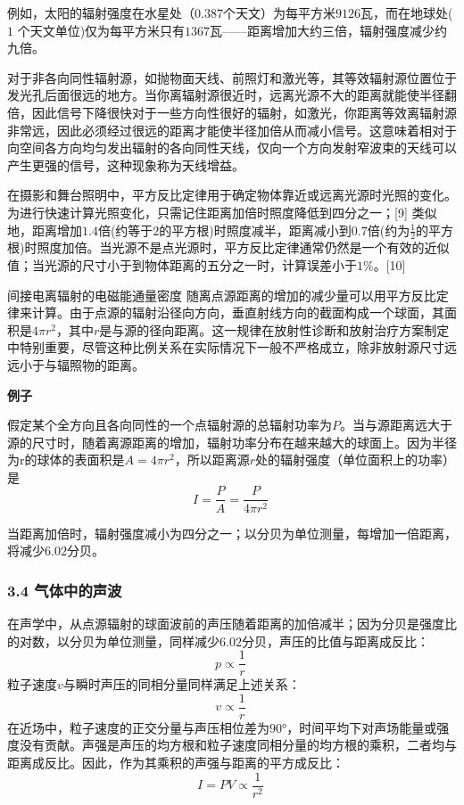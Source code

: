 例如，太阳的辐射强度在水星处（$0.387$个天文）为每平方米$9126$瓦，而在地球处($1$ 个天文单位)仅为每平方米只有$1367$瓦——距离增加大约三倍，辐射强度减少约九倍。

对于非各向同性辐射源，如抛物面天线、前照灯和激光等，其等效辐射源位置位于发光孔后面很远的地方。当你离辐射源很近时，远离光源不大的距离就能使半径翻倍，因此信号下降很快对于一些方向性很好的辐射，如激光，你距离等效离辐射源非常远，因此必须经过很远的距离才能使半径加倍从而减小信号。这意味着相对于向空间各方向均匀发出辐射的各向同性天线，仅向一个方向发射窄波束的天线可以产生更强的信号，这种现象称为天线增益。

在摄影和舞台照明中，平方反比定律用于确定物体靠近或远离光源时光照的变化。为进行快速计算光照变化，只需记住距离加倍时照度降低到四分之一；[9] 类似地，距离增加$1.4$倍(约等于$2$的平方根)时照度减半，距离减小到$0.7$倍(约为$\frac{1}{2}$的平方根)时照度加倍。当光源不是点光源时，平方反比定律通常仍然是一个有效的近似值；当光源的尺寸小于到物体距离的五分之一时，计算误差小于$1 \%$。[10]

间接电离辐射的电磁能通量密度 随离点源距离的增加的减少量可以用平方反比定律来计算。由于点源的辐射沿径向方向，垂直射线方向的截面构成一个球面，其面积是$4\pi r^2$，其中$r$是与源的径向距离。这一规律在放射性诊断和放射治疗方案制定中特别重要，尽管这种比例关系在实际情况下一般不严格成立，除非放射源尺寸远远小于与辐照物的距离。

\textbf{例子}

假定某个全方向且各向同性的一个点辐射源的总辐射功率为$P$。当与源距离远大于源的尺寸时，随着离源距离的增加，辐射功率分布在越来越大的球面上。因为半径为r的球体的表面积是$A=4\pi r^2$，所以距离源$r$处的辐射强度（单位面积上的功率）是
\begin{equation}
I=\frac{P}{A}=\frac{P}{4\pi r^2}~
\end{equation}

当距离加倍时，辐射强度减小为四分之一；以分贝为单位测量，每增加一倍距离，将减少$6.02$分贝。

\subsubsection{3.4 气体中的声波}
在声学中，从点源辐射的球面波前的声压随着距离的加倍减半；因为分贝是强度比的对数，以分贝为单位测量，同样减少$6.02$分贝，声压的比值与距离成反比：
\begin{equation}
p  \propto \frac{1}{r}~
\end{equation}
粒子速度$v$与瞬时声压的同相分量同样满足上述关系：
\begin{equation}
v  \propto \frac{1}{r}~
\end{equation}
在近场中，粒子速度的正交分量与声压相位差为$90$°，时间平均下对声场能量或强度没有贡献。声强是声压的均方根和粒子速度同相分量的均方根的乘积，二者均与距离成反比。因此，作为其乘积的声强与距离的平方成反比：
\begin{equation}
I=PV \propto \frac{1}{r^2}~
\end{equation}
